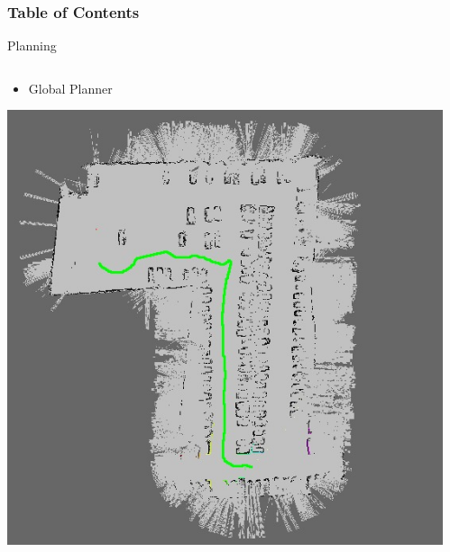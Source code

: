 \graphicspath{
  {./images/bmps/}{./images/vects/}{./images/}
  {./images/presentation/bmps/}{./images/presentation/vects/}{./images/presentation/}
  {./images/chapter00/bmps/}{./images/chapter00/vects/}{./images/chapter00/}
  {./images/chapter06/bmps/}{./images/chapter06/vects/}{./images/chapter06/}
  {./images/chapter07/bmps/}{./images/chapter07/vects/}{./images/chapter07/}
}

\begin{frame}
  \frametitle{Table of Contents}
  \tiny
  \tableofcontents[currentsection]
\end{frame}
  
\begin{frame}{Planning}
  \begin{columns}[c] %
      \begin{overlayarea}{\textwidth}{\textheight}
	\begin{itemize}
	\item Global Planner
	\end{itemize}
	\includegraphics[width=\textwidth]{figure7}
      \end{overlayarea}
      \begin{overlayarea}{\textwidth}{\textheight}
	\begin{itemize}

\end{itemize}
\end{overlayarea}
\end{columns}
\end{frame}
